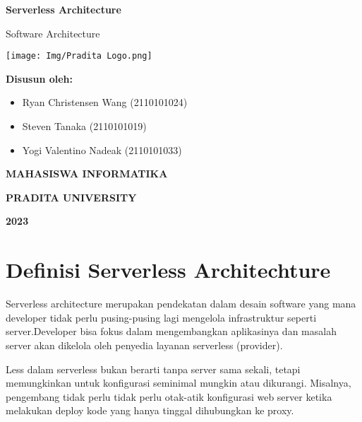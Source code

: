 \documentclass[a4paper,12pt]{article}
\begin{document}
\begin{titlepage}
	\begin{center}
		\textbf{\huge Serverless Architecture}

		\vspace{0.5cm}

		{\large Software Architecture}

		\vspace{1.5cm}

		\texttt{[image: Img/Pradita Logo.png]}

		\vspace{1.5cm}

		\textbf{\large Disusun oleh:}

		\vspace{0.5cm}

		\begin{varwidth}{\textwidth}
			\begin{itemize}
				\item Ryan Christensen Wang (2110101024)
				\item Steven Tanaka (2110101019)
				\item Yogi Valentino Nadeak (2110101033)
			\end{itemize}
		\end{varwidth}

		\vspace{3.5cm}

		\textbf{\large MAHASISWA INFORMATIKA}

		\vspace{0.5cm}

		\textbf{\large PRADITA UNIVERSITY}

		\vspace{0.5cm}

		\textbf{\large 2023}
	\end{center}
\end{titlepage}

\section*{Definisi Serverless Architechture}
Serverless architecture merupakan pendekatan dalam desain software yang mana developer tidak perlu pusing-pusing lagi mengelola infrastruktur seperti server.Developer bisa fokus dalam mengembangkan aplikasinya dan masalah server akan dikelola oleh penyedia layanan serverless (provider).

Less dalam serverless bukan berarti tanpa server sama sekali, tetapi memungkinkan untuk konfigurasi seminimal mungkin atau dikurangi. Misalnya, pengembang tidak perlu tidak perlu otak-atik konfigurasi web server ketika melakukan deploy kode yang hanya tinggal dihubungkan ke proxy.
\end{document}
